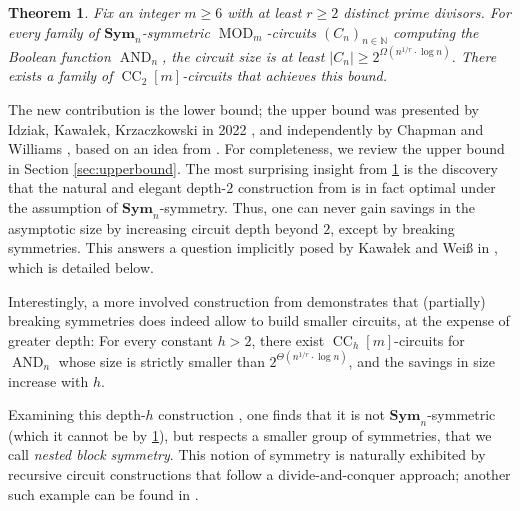 \documentclass[11pt]{article}
\DeclareMathOperator{\MOD}{MOD}
\DeclareMathOperator{\AND}{AND}
\newcommand{\Sym}{\mathbf{Sym}}
\newcommand{\bbN}{\mathbb{N}}
\theoremstyle{definition}
\theoremstyle{plain}
\newtheorem{theorem}[definition]{Theorem}
\theoremstyle{remark}
\theoremstyle{remark}
\DeclareMathOperator{\CC}{CC}
\begin{document}
\begin{theorem}
	\label{thm:main1}
	Fix an integer $m \geq 6$ with at least $r \geq 2$ distinct prime divisors.
	For every family of $\Sym_n$-symmetric $\MOD_m$-circuits $(C_n)_{n \in \bbN}$ computing the Boolean function $\AND_n$, the circuit size is at least $|C_n| \geq 2^{\Omega(n^{1/r} \cdot \log n)}$. There exists a family of $\CC_2[m]$-circuits that achieves this bound.
\end{theorem}	
The new contribution is the lower bound; the upper bound was presented by Idziak, Kawa\l ek, Krzaczkowski in 2022 \cite[Proposition 3.1]{IdziakKK22LICS}, and independently by Chapman and Williams \cite{ChapmanW22}, based on an idea from \cite{BarringtonBR94}. For completeness, we review the upper bound in Section \ref{sec:upperbound}. 
The most surprising insight from \cref{thm:main1} is the discovery that the natural and elegant depth-$2$ construction from \cite[Proposition 3.1]{IdziakKK22LICS} is in fact optimal under the assumption of $\Sym_n$-symmetry. 
Thus, one can never gain savings in the asymptotic size by increasing circuit depth beyond $2$, except by breaking symmetries. This answers a question implicitly posed by Kawa\l ek and Weiß in \cite{kawalekweiss25}, which is detailed below. 

Interestingly, a more involved construction from \cite{IdziakKK22LICS} demonstrates that (partially) breaking symmetries does indeed allow to build smaller circuits, at the expense of greater depth: For every constant $h > 2$, there exist $\CC_h[m]$-circuits for $\AND_n$ whose size is strictly smaller than $2^{\Theta(n^{1/r} \cdot \log n)}$, and the savings in size increase with $h$. 

Examining this depth-$h$ construction \cite[Proposition 4.3]{IdziakKK22LICS}, one finds that it is not $\Sym_n$-symmetric (which it cannot be by \cref{thm:main1}), but respects a smaller group of symmetries, that we call \emph{nested block symmetry}. 
This notion of symmetry is naturally exhibited by recursive circuit constructions that follow a divide-and-conquer approach; another such example can be found in \cite{ChapmanW22}. 
\end{document}
